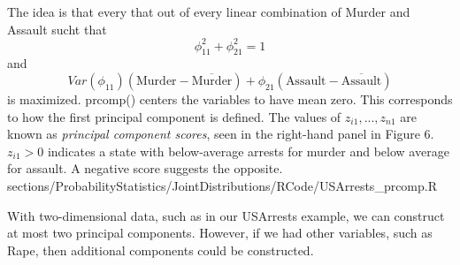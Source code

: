 {%
	\RTheory
	{	
		The idea is that every that out of every linear combination of Murder and Assault sucht that%
		$$\phi_{11}^2+\phi_{21}^2 = 1$$
		and \vfill
		$$Var(\phi_{11})(\mbox{Murder}-\overline{\mbox{Murder}})+\phi_{21}(\mbox{Assault}-\overline{\mbox{Assault}})$$
		is maximized. 
		\newline
		{\color{blue}prcomp()} centers the variables to have mean zero. This corresponds to how the first principal component is defined.
		\newline
		\newline
		The values of $z_{i1},...,z_{n1}$ are known as \textit{principal component scores}, seen in the right-hand panel in Figure 6. $z_{i1} > 0$ indicates a state with below-average arrests for murder and below average for assault. A negative score suggests the opposite.
		\newline
		\newline
 	}
	{sections/ProbabilityStatistics/JointDistributions/RCode/USArrests_prcomp.R}

	With two-dimensional data, such as in our USArrests example, we can construct at most two principal components. However, if we had other variables, such as Rape, then additional components could be constructed.
	
}
